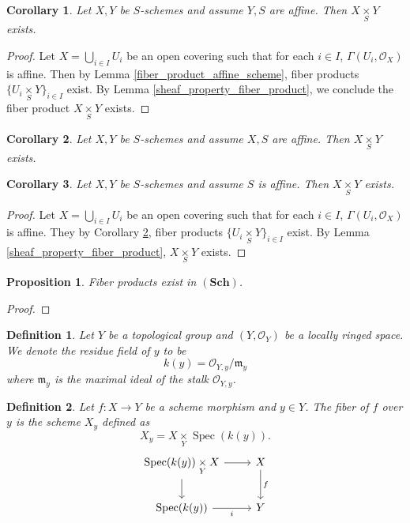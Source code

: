 \documentclass{article}
\newtheorem{proposition}{Proposition}[section]
\newtheorem{definition}{Definition}[section]
\newtheorem{corollary}{Corollary}[section]
\numberwithin{equation}{section}
\DeclareMathOperator{\Spec}{Spec}
\newcommand{\fib}[1]{%
  \mathbin{\mathop{\times}\limits_{#1}}%
}
\begin{document}
\begin{corollary}
Let $X,Y$ be $S$-schemes and assume $Y,S$ are affine. Then $X\fib{S}Y$ exists.
\end{corollary}

\begin{proof}
Let $X=\bigcup_{i\in I}U_i$ be an open covering such that for each $i\in I$, $\Gamma(U_i,\mathcal{O}_X)$ is affine. Then by Lemma \ref{fiber_product_affine_scheme}, fiber products $\{U_i\fib{S}Y\}_{i\in I}$ exist. By Lemma \ref{sheaf_property_fiber_product}, we conclude the fiber product $X\fib{S}Y$ exists.
\end{proof}

\begin{corollary}
Let $X,Y$ be $S$-schemes and assume $X,S$ are affine. Then $X\fib{S}Y$ exists.
\label{right_locally_affine_fiber_product}
\end{corollary}

\begin{corollary}
Let $X,Y$ be $S$-schemes and assume $S$ is affine. Then $X\fib{S}Y$ exists.
\end{corollary}

\begin{proof}
Let $X=\bigcup_{i\in I}U_i$ be an open covering such that for each $i\in I$, $\Gamma(U_i,\mathcal{O}_X)$ is affine. They by Corollary \ref{right_locally_affine_fiber_product}, fiber products $\{U_i\fib{S}Y\}_{i\in I}$ exist. By Lemma \ref{sheaf_property_fiber_product}, $X\fib{S}Y$ exists. 
\end{proof}

\begin{proposition}
Fiber products exist in $(\mathbf{Sch})$. 
\end{proposition}

\begin{proof}
\end{proof}

\begin{definition}
Let $Y$ be a topological group and $(Y,\mathcal{O}_Y)$ be a locally ringed space. We denote the residue field of $y$ to be
\begin{equation*}
k(y) = \mathcal{O}_{Y,y}/\mathfrak{m}_y
\end{equation*}
where $\mathfrak{m}_y$ is the maximal ideal of the stalk $\mathcal{O}_{Y,y}$.
\end{definition}

\begin{definition}
Let $f:X\to Y$ be a scheme morphism and $y\in Y$. The fiber of $f$ over $y$ is the scheme $X_y$ defined as
\begin{equation*}
X_y = X\fib{Y}\Spec(k(y)).
\end{equation*}
\[
\begin{tikzcd}
\Spec(k(y))\fib{Y}X \arrow[d] \arrow[r] & X \arrow[d, "f"] \\
\Spec(k(y)) \arrow[r, "i"']             & Y               
\end{tikzcd}
\]
\end{definition}
\end{document}
